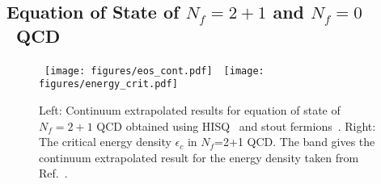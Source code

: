 \documentclass{PoS}
\begin{document}
\subsection{Equation of State of $N_f=2+1$ and $N_f=0$~QCD}
\label{sec:EoS}

\begin{figure}[htp!]
\begin{center}
~\texttt{[image: figures/eos\_cont.pdf]}~~\texttt{[image: figures/energy\_crit.pdf]}
\end{center}
\caption{Left: Continuum extrapolated results for equation of state of $N_f=2+1$ QCD obtained using HISQ~\cite{Bazavov:2014pvz} and stout fermions~\cite{Borsanyi:2013bia}. Right: The critical energy density $\epsilon_c$ in $N_f$=2+1 QCD. The band gives the continuum extrapolated result for the energy density taken from Ref.~\cite{Bazavov:2014pvz}.}
\label{fig:EoS}
\end{figure}
\end{document}

